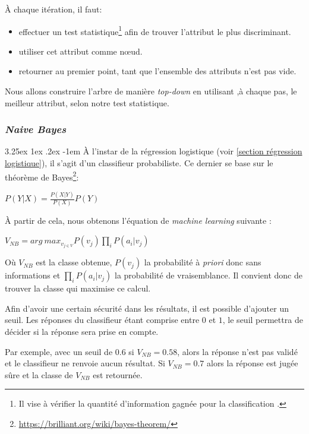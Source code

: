 \documentclass[a4paper, 11pt]{article}
\makeatletter
\renewcommand\paragraph{\@startsection{paragraph}{5}{\z@}%
  {3.25ex \@plus1ex \@minus.2ex}%
  {-1em}%
  {\normalfont\normalsize\bfseries}}
\makeatother
\begin{document}
À chaque itération, il faut:
\begin{itemize}
 \item effectuer un test statistique\footnote{Il vise à vérifier la quantité d'information gagnée pour 
 la classification \cite{id3}.} afin de trouver l'attribut le plus discriminant.
 \item utiliser cet attribut comme nœud.
 \item retourner au premier point, tant que l'ensemble des attributs n'est pas vide.
\end{itemize}

Nous allons construire l'arbre de manière \textit{top-down} en utilisant ,à chaque pas, le meilleur attribut, selon notre test
statistique.


\subsubsection{\textit{Naive Bayes}}\label{section naive bayes}
\paragraph{}
À l'instar de la régression logistique (voir \ref{section régression logistique}), il s'agit d'un classifieur probabiliste. 
Ce dernier se base sur le théorème de Bayes\footnote{\url{https://brilliant.org/wiki/bayes-theorem/}}:
\begin{center}
$P(Y|X) = \frac{P(X|Y)}{P(X)}P(Y)$
\end{center}

À partir de cela, nous obtenons l'équation de \textit{machine learning} suivante \cite{machine_learning_automated_trading}:
\begin{center}
$V_{NB} = arg\ max_{v_{j \in V}} P(v_j) \prod\limits_i P(a_i | v_j)$
\end{center}
Où $V_{NB}$ est la classe obtenue, $P(v_j)$ la probabilité à \textit{priori} donc sans informations 
et $\prod\limits_i P(a_i | v_j)$ la probabilité de vraisemblance.
Il convient donc de trouver la classe qui maximise ce calcul.

Afin d'avoir une certain sécurité dans les résultats, il est possible d'ajouter un seuil. 
Les réponses du classifieur étant comprise entre $0$ et $1$, le seuil permettra de décider si la réponse sera prise en compte.

Par exemple, avec un seuil de $0.6$ si $V_{NB} = 0.58$, alors la réponse n'est pas validé et le classifieur ne renvoie aucun
résultat. Si $V_{NB} = 0.7$ alors la réponse est jugée sûre et la classe de $V_{NB}$ est retournée. 
\end{document}
